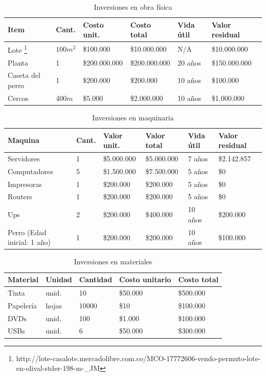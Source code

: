 \documentclass[a4paper, 12pt, oneside]{article}
\begin{document}
	\begin{table}
		\caption{Inversiones en obra física}
		\begin{tabular}{ | p{3cm} | p{1cm} | p{2.5cm} | p{2.5cm} | p{1cm} | p{2.2cm} | }
		\hline
		Item & Cant. & Costo unit. & Costo total & Vida útil & Valor residual \\
		\hline					
		Lote \footnote{http://lote-casalote.mercadolibre.com.co/MCO-17772606-vendo-permuto-lote-en-olival-stder-198-m-_JM} & $100m^2$ & \$100.000 & \$10.000.000 & N/A & \$10.000.000 \\
		\hline					
		Planta & 1 & \$200.000.000 & \$200.000.000 & 20 años & \$150.000.000 \\
		\hline
		Caseta del perro & 1 & \$200.000 & \$200.000 & 10 años & \$100.000 \\ 
		\hline
		Cercos & $400m$ & \$5.000 & \$2.000.000 & 10 años & \$1.000.000 \\
		\hline
		\end{tabular}
		\label{tb:invFisica}
	\end{table}

	\begin{table}
		\caption{Inversiones en maquinaria}
		\begin{tabular}{ | p{3cm} | p{1cm} | p{2.5cm} | p{2.5cm} | p{1cm} | p{2cm} | }
		\hline
		Maquina & Cant. & Valor unit. & Valor total & Vida útil & Valor residual \\
		\hline					
		Servidores & 1 & \$5.000.000 & \$5.000.000 & 7 años & \$2.142.857 \\
		\hline					
		Computadores & 5 & \$1.500.000 & \$7.500.000 & 5 años & \$0 \\
		\hline
		Impresoras & 1 & \$200.000 & \$200.000 & 5 años & \$0 \\ 
		\hline
		Routers & 1 & \$200.000 & \$200.000 & 5 años & \$0 \\
		\hline
		Ups & 2 & \$200.000 & \$400.000 & 10 años & \$200.000 \\
		\hline
		Perro (Edad inicial: 1 año) & 1 & \$200.000 & \$200.000 & 10 años & \$100.000 \\
		\hline
		\end{tabular}
		\label{tb:invMaquinaria}
	\end{table}

	\begin{table}
		\caption{Inversiones en materiales}
		\begin{tabular}{ | p{3cm} | p{1.5cm} | p{1.5cm} | p{2cm} | p{2cm} | }
		\hline
		Material & Unidad & Cantidad & Costo unitario & Costo total \\
		\hline
		Tinta & unid. & 10 & \$50.000 & \$500.000 \\ 
		\hline					
		Papelería & hojas & 10000 & \$10 & \$100.000 \\
		\hline
		DVDs & unid. & 100 & \$1.000 & \$100.000 \\
		\hline
		USBs & unid. & 6 & \$50.000 & \$300.000 \\
		\hline
		\end{tabular}
		\label{tb:invMateriales}
	\end{table}
\end{document}
